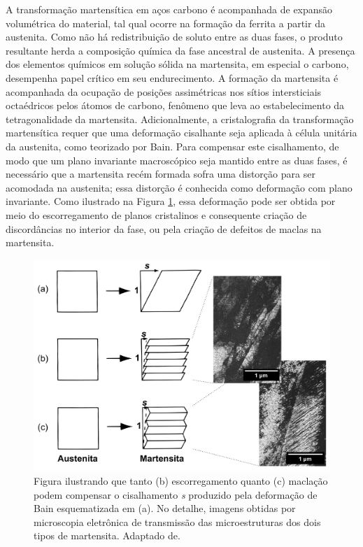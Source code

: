 A transformação martensítica em aços carbono é acompanhada de expansão volumétrica do material, tal qual ocorre na formação da ferrita a partir da austenita. Como não há redistribuição de soluto entre as duas fases, o produto resultante herda a composição química da fase ancestral de austenita. A presença dos elementos químicos em solução sólida na martensita, em especial o carbono, desempenha papel crítico em seu endurecimento. A formação da martensita é acompanhada da ocupação de posições assimétricas nos sítios intersticiais octaédricos pelos átomos de carbono, fenômeno que leva ao estabelecimento da tetragonalidade da martensita\cite{Zener1946,Hillert1986}. Adicionalmente, a cristalografia da transformação martensítica requer que uma deformação cisalhante seja aplicada à célula unitária da austenita, como teorizado por Bain\cite{Bain1924}. Para compensar este cisalhamento, de modo que um plano invariante macroscópico seja mantido entre as duas fases, é necessário que a martensita recém formada sofra uma distorção para ser acomodada na austenita; essa distorção é conhecida como deformação com plano invariante\cite{Honeycombe2006}. Como ilustrado na Figura \ref{fig:cisMartensita}, essa deformação pode ser obtida por meio do escorregamento de planos cristalinos e consequente criação de discordâncias no interior da fase, ou pela criação de defeitos de maclas na martensita.

\begin{figure}
  \includegraphics[width=14cm]{img/shearMartensite.pdf}
  \caption{Figura ilustrando que tanto (b) escorregamento quanto (c) maclação podem compensar o cisalhamento \textit{s} produzido pela deformação de Bain esquematizada em (a). No detalhe, imagens obtidas por microscopia eletrônica de transmissão das microestruturas dos dois tipos de martensita. Adaptado de\cite{Porter2009}.}
  \label{fig:cisMartensita}
\end{figure}

